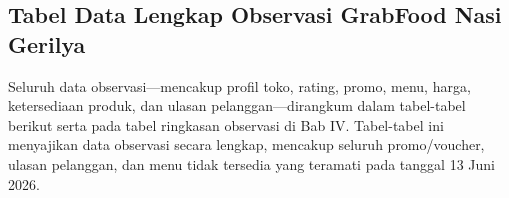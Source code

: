 \subsection*{Tabel Data Lengkap Observasi GrabFood Nasi Gerilya}

Seluruh data observasi---mencakup profil toko, rating, promo, menu, harga, ketersediaan produk, dan ulasan pelanggan---dirangkum dalam tabel-tabel berikut serta pada tabel ringkasan observasi di Bab IV. Tabel-tabel ini menyajikan data observasi secara lengkap, mencakup seluruh promo/voucher, ulasan pelanggan, dan menu tidak tersedia yang teramati pada tanggal 13 Juni 2026.






